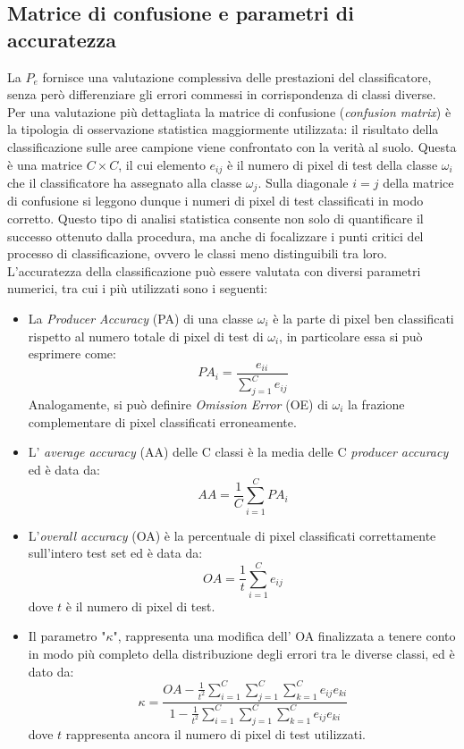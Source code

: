 \subsection{Matrice di confusione e parametri di accuratezza}
La $P_e$ fornisce una valutazione complessiva delle prestazioni del classificatore, senza però differenziare gli errori commessi in corrispondenza di classi diverse. Per una valutazione più dettagliata la matrice di confusione (\emph{confusion matrix}) è la tipologia di osservazione statistica maggiormente utilizzata: il risultato della classificazione sulle aree campione viene confrontato con la verità al suolo. Questa è una matrice $C \times C$, il cui elemento $e_{ij}$ è il numero di pixel di test della classe $\omega_i$ che il classificatore ha assegnato alla classe $\omega_j$. Sulla diagonale $i=j$ della matrice di confusione si leggono dunque i numeri di pixel di test classificati in modo corretto. Questo tipo di analisi statistica consente non solo di quantificare il successo ottenuto dalla procedura, ma anche di focalizzare i punti critici del processo di classificazione, ovvero le classi meno distinguibili tra loro. \\
L'accuratezza della classificazione può essere valutata con diversi parametri numerici, tra cui i più utilizzati sono i seguenti:
\begin{itemize}
\item La \emph{Producer Accuracy} (PA) di una classe $\omega_i$ è la
parte di pixel ben classificati rispetto al numero totale di
pixel di test di $\omega_i$, in particolare essa si può esprimere
come:
\begin{equation}
\label{eq:PA}
PA_i=\dfrac{e_{ii}}{\sum_{j=1}^Ce_{ij}}
\end{equation}
Analogamente, si può definire \emph{Omission Error} (OE) di $\omega_i$ la frazione complementare di pixel classificati erroneamente.
\item L' \emph{average accuracy} (AA) delle C classi è la media delle C \emph{producer accuracy} ed è data da:
\begin{equation}
\label{eq:AA}
AA=\dfrac{1}{C}\sum_{i=1}^C{PA_i}
\end{equation}
\item L'\emph{overall accuracy }(OA) è la percentuale di pixel classificati correttamente sull'intero test set ed è data da:
\begin{equation}
\label{eq:OA}
OA= \dfrac{1}{t}\sum_{i=1}^C e_{ij}
\end{equation}
dove $t$ è il numero di pixel di test.
\item Il parametro "$\kappa$", rappresenta una modifica dell' OA finalizzata a tenere conto in modo più completo della distribuzione degli errori tra le diverse classi, ed è dato da:
\begin{equation}
\label{eq:K}
\kappa=\dfrac{OA-\frac{1}{t^2}\sum_{i=1}^C\sum_{j=1}^C\sum_{k=1}^C e_{ij}e_{ki}}{1-\frac{1}{t^2}\sum_{i=1}^C\sum_{j=1}^C\sum_{k=1}^C e_{ij} e_{ki}}
\end{equation}
dove $t$ rappresenta ancora il numero di pixel di test utilizzati.
\end{itemize}


